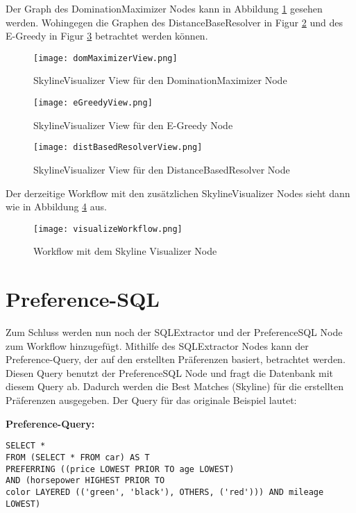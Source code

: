 Der Graph des DominationMaximizer Nodes kann in Abbildung \ref{img:domMaximizerView} gesehen werden. Wohingegen die Graphen des DistanceBaseResolver in Figur \ref{img:eGreedyView} und des E-Greedy in Figur \ref{img:distBasedResolverView} betrachtet werden können. 

\begin{figure}[H]
	\centering
	\texttt{[image: domMaximizerView.png]}
	\caption{SkylineVisualizer View für den DominationMaximizer Node}
	\label{img:domMaximizerView}
	
\end{figure} 
	\begin{figure}[H]
	\centering
	\texttt{[image: eGreedyView.png]}
	\caption{SkylineVisualizer View für den E-Greedy Node}
	\label{img:eGreedyView}
\end{figure} 

\begin{figure}[H]
	\centering
	\texttt{[image: distBasedResolverView.png]}
	\caption{SkylineVisualizer View für den DistanceBasedResolver Node}
	\label{img:distBasedResolverView}
\end{figure} 

Der derzeitige Workflow mit den zusätzlichen SkylineVisualizer Nodes sieht dann wie in Abbildung \ref{img:visualizeWorkflow} aus.

\begin{figure}[H]
	\centering
	\texttt{[image: visualizeWorkflow.png]}
	\caption{Workflow mit dem Skyline Visualizer Node}
	\label{img:visualizeWorkflow}
\end{figure} 

\section{Preference-SQL}
\label{ch:Evaluierung:sec:prefSQL}
Zum Schluss werden nun noch der SQLExtractor und der PreferenceSQL Node zum Workflow hinzugefügt. Mithilfe des SQLExtractor Nodes kann der Preference-Query, der auf den erstellten Präferenzen basiert, betrachtet werden. Diesen Query benutzt der PreferenceSQL Node und fragt die Datenbank mit diesem Query ab. Dadurch werden die Best Matches (Skyline) für die erstellten Präferenzen ausgegeben. Der Query für das originale Beispiel lautet:
 
\textbf{Preference-Query:}
\begin{lstlisting}
SELECT * 
FROM (SELECT * FROM car) AS T 
PREFERRING ((price LOWEST PRIOR TO age LOWEST) 
AND (horsepower HIGHEST PRIOR TO 
color LAYERED (('green', 'black'), OTHERS, ('red'))) AND mileage LOWEST)
\end{lstlisting}

